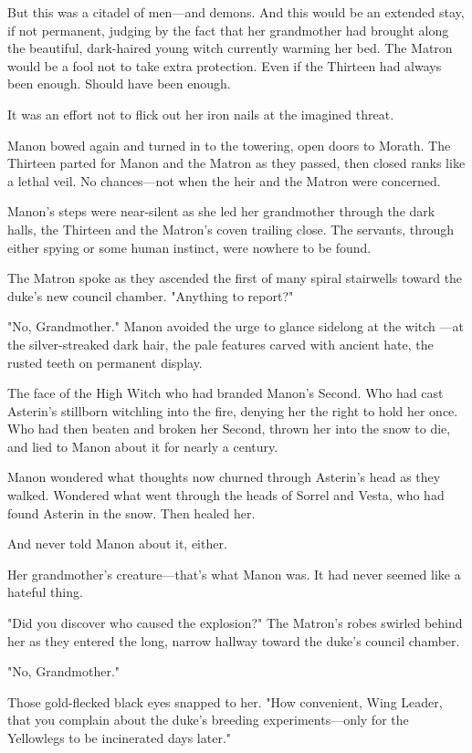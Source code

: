 But this was a citadel of men---and demons.
And this would be an extended stay, if not permanent, judging by the fact that her grandmother had brought along the beautiful, dark-haired young witch currently warming her bed.
The Matron would be a fool not to take extra protection.
Even if the Thirteen had always been enough.
Should have been enough.

It was an effort not to flick out her iron nails at the imagined threat.

Manon bowed again and turned in to the towering, open doors to Morath.
The Thirteen parted for Manon and the Matron as they passed, then closed ranks like a lethal veil.
No chances---not when the heir and the Matron were concerned.

Manon's steps were near-silent as she led her grandmother through the dark halls, the Thirteen and the Matron's coven trailing close.
The servants, through either spying or some human instinct, were nowhere to be found.

The Matron spoke as they ascended the first of many spiral stairwells toward the duke's new council chamber.
"Anything to report?"

"No, Grandmother."
Manon avoided the urge to glance sidelong at the witch ---at the silver-streaked dark hair, the pale features carved with ancient hate, the rusted teeth on permanent display.

The face of the High Witch who had branded Manon's Second.
Who had cast Asterin's stillborn witchling into the fire, denying her the right to hold her once.
Who had then beaten and broken her Second, thrown her into the snow to die, and lied to Manon about it for nearly a century.

Manon wondered what thoughts now churned through Asterin's head as they walked.
Wondered what went through the heads of Sorrel and Vesta, who had found Asterin in the snow.
Then healed her.

And never told Manon about it, either.

Her grandmother's creature---that's what Manon was.
It had never seemed like a hateful thing.

"Did you discover who caused the explosion?"
The Matron's robes swirled behind her as they entered the long, narrow hallway toward the duke's council chamber.

"No, Grandmother."

Those gold-flecked black eyes snapped to her.
"How convenient, Wing Leader, that you complain about the duke's breeding experiments---only for the Yellowlegs to be incinerated days later."


